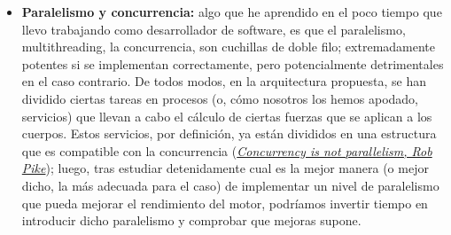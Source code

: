 \begin{itemize}
    \item \textbf{Paralelismo y concurrencia:} algo que he aprendido en el poco tiempo que llevo trabajando como desarrollador de software, es que el paralelismo, multithreading, la concurrencia, son cuchillas de doble filo; extremadamente potentes si se implementan correctamente, pero potencialmente detrimentales en el caso contrario. De todos modos, en la arquitectura propuesta, se han dividido ciertas tareas en procesos (o, cómo nosotros los hemos apodado, servicios) que llevan a cabo el cálculo de ciertas fuerzas que se aplican a los cuerpos. Estos servicios, por definición, ya están divididos en una estructura que es compatible con la concurrencia (\href{https://www.youtube.com/watch?v=oV9rvDllKEg}{\textit{Concurrency is not parallelism, Rob Pike}}); luego, tras estudiar detenidamente cual es la mejor manera (o mejor dicho, la más adecuada para el caso) de implementar un nivel de paralelismo que pueda mejorar el rendimiento del motor, podríamos invertir tiempo en introducir dicho paralelismo y comprobar que mejoras supone.
\end{itemize}